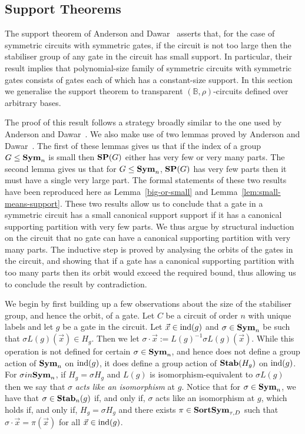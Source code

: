 \documentclass[../paper.tex]{subfiles}
\begin{document}
\subsection{Support Theorems}
The support theorem of Anderson and Dawar~\cite{AndersonD17} asserts that, for
the case of symmetric circuits with symmetric gates, if the circuit is not too
large then the stabiliser group of any gate in the circuit has small support. In
particular, their result implies that polynomial-size family of symmetric
circuits with symmetric gates consists of gates each of which has a
constant-size support. In this section we generalise the support theorem to
transparent $(\mathbb{B}, \rho)$-circuits defined over arbitrary bases.

The proof of this result follows a strategy broadly similar to the one used by
Anderson and Dawar~\cite{AndersonD17}. We also make use of two lemmas proved by
Anderson and Dawar~\cite{AndersonD17}. The first of these lemmas gives us that
if the index of a group $G \leq \text{\textbf{Sym}}_n$ is small then $\text{\textbf{SP}}(G)$ either has very
few or very many parts. The second lemma gives us that for $G \leq \text{\textbf{Sym}}_n$,
$\text{\textbf{SP}}(G)$ has very few parts then it must have a single very large part. The
formal statements of these two results have been reproduced here as
Lemma~\ref{big-or-small} and Lemma~\ref{lem:small-means-support}. These two
results allow us to conclude that a gate in a symmetric circuit has a small
canonical support support if it has a canonical supporting partition with very
few parts. We thus argue by structural induction on the circuit that no gate can
have a canonical supporting partition with very many parts. The inductive step
is proved by analysing the orbits of the gates in the circuit, and showing that
if a gate has a canonical supporting partition with too many parts then its
orbit would exceed the required bound, thus allowing us to conclude the result
by contradiction.

We begin by first building up a few observations about the size of the
stabiliser group, and hence the orbit, of a gate. Let $C$ be a circuit of order
$n$ with unique labels and let $g$ be a gate in the circuit. Let $\vec{x} \in
\text{\upshape ind}(g)$ and $\sigma \in \text{\textbf{Sym}}_n$ be such that $\sigma L(g)(\vec{x}) \in H_g$.
Then we let $\sigma \cdot \vec{x} := L(g)^{-1}\sigma L(g)(\vec{x})$. While this
operation is not defined for certain $\sigma \in \text{\textbf{Sym}}_n$, and hence does not
define a group action of $\text{\textbf{Sym}}_n$ on $\text{\upshape ind}(g)$, it does define a group action of
$\text{\textbf{Stab}}(H_g)$ on $\text{\upshape ind}(g)$. For $\sigma in \text{\textbf{Sym}}_n$, if $H_g = \sigma H_g$ and
$L(g)$ is isomorphism-equivalent to $\sigma L(g)$ then we say that $\sigma$
\emph{acts like an isomorphism} at $g$. Notice that for $\sigma \in \text{\textbf{Sym}}_n$, we
have that $\sigma \in \text{\textbf{Stab}}_n(g)$ if, and only if, $\sigma$ acts like an
isomorphism at $g$, which holds if, and only if, $H_g = \sigma H_g$ and there
exists $\pi \in \text{\textbf{SortSym}}_{\tau,D}$ such that $\sigma \cdot \vec{x} = \pi (\vec{x})$
for all $\vec{x} \in \text{\upshape ind}(g)$.
\end{document}
